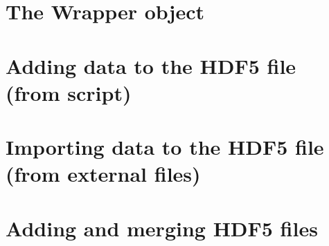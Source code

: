 \section{The Wrapper object}
    

\section{Adding data to the HDF5 file (from script)}
    

\section{Importing data to the HDF5 file (from external files)}
    

\section{Adding and merging HDF5 files}
    